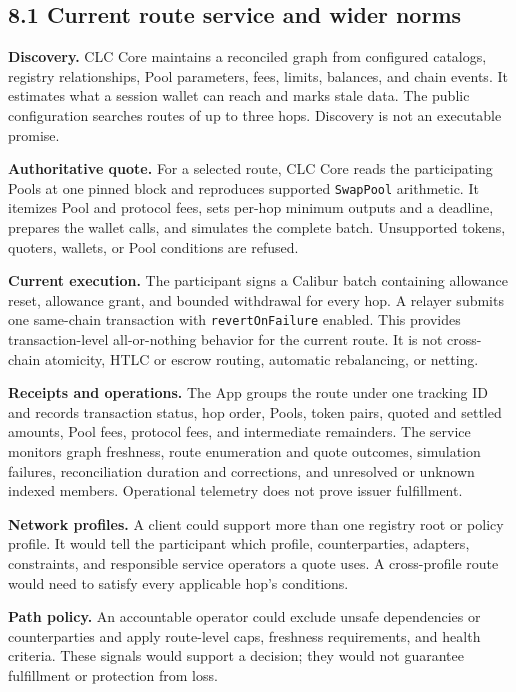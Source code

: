 \documentclass[11pt]{article}
\begin{document}
\subsection*{8.1 Current route service and wider norms}

\textbf{Discovery.} CLC Core maintains a reconciled graph from configured catalogs, registry relationships, Pool parameters, fees, limits, balances, and chain events. It estimates what a session wallet can reach and marks stale data. The public configuration searches routes of up to three hops. Discovery is not an executable promise.

\textbf{Authoritative quote.} For a selected route, CLC Core reads the participating Pools at one pinned block and reproduces supported \texttt{SwapPool} arithmetic. It itemizes Pool and protocol fees, sets per-hop minimum outputs and a deadline, prepares the wallet calls, and simulates the complete batch. Unsupported tokens, quoters, wallets, or Pool conditions are refused.

\textbf{Current execution.} The participant signs a Calibur batch containing allowance reset, allowance grant, and bounded withdrawal for every hop. A relayer submits one same-chain transaction with \texttt{revertOnFailure} enabled. This provides transaction-level all-or-nothing behavior for the current route. It is not cross-chain atomicity, HTLC or escrow routing, automatic rebalancing, or netting.

\textbf{Receipts and operations.} The App groups the route under one tracking ID and records transaction status, hop order, Pools, token pairs, quoted and settled amounts, Pool fees, protocol fees, and intermediate remainders. The service monitors graph freshness, route enumeration and quote outcomes, simulation failures, reconciliation duration and corrections, and unresolved or unknown indexed members. Operational telemetry does not prove issuer fulfillment.

\textbf{Network profiles.} A client could support more than one registry root or policy profile. It would tell the participant which profile, counterparties, adapters, constraints, and responsible service operators a quote uses. A cross-profile route would need to satisfy every applicable hop's conditions.

\textbf{Path policy.} An accountable operator could exclude unsafe dependencies or counterparties and apply route-level caps, freshness requirements, and health criteria. These signals would support a decision; they would not guarantee fulfillment or protection from loss.
\end{document}
